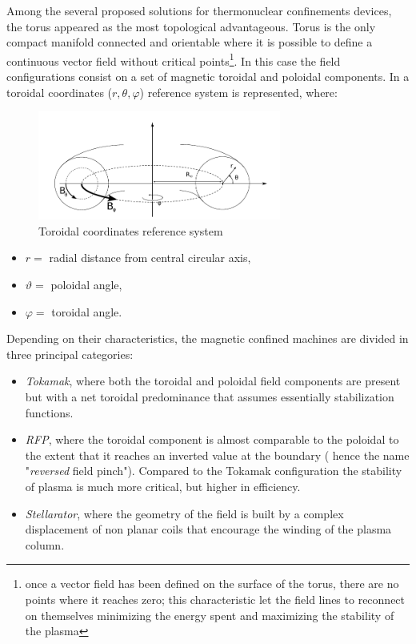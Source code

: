 Among the several proposed solutions for thermonuclear confinements devices, the torus appeared as the most topological advantageous. Torus is the only compact manifold connected and orientable where it is possible to define a continuous vector field without critical points\footnote{once a vector field has been defined on the surface of the torus, there are no points where it reaches zero; this characteristic let the field lines to reconnect on themselves minimizing the energy spent and maximizing the stability of the plasma}.
In this case the field configurations consist on a set of magnetic toroidal and poloidal components. In \Figure{\ref{fig:intro_toroidal_coords}} a toroidal coordinates ($r,\theta,\varphi$) reference system is represented, where:
\begin{figure}[h!]
    \centering
    \includegraphics[width=8cm]{img/1_intro/toroidal_coords.png}
    \caption{Toroidal coordinates reference system}
    \label{fig:intro_toroidal_coords}
\end{figure}
\begin{itemize}
    \item $r = $ radial distance from central circular axis,
    \item $\vartheta = $ poloidal angle,
    \item $\varphi = $ toroidal angle.
\end{itemize}
Depending on their characteristics, the magnetic confined machines are divided in three principal categories:
\begin{itemize}
    \item \textit{Tokamak}, where both the toroidal and poloidal field components are present but with a net toroidal predominance that assumes essentially stabilization functions.
    \item \textit{RFP}, where the toroidal component is almost comparable to the poloidal to the extent that it reaches an inverted value at the boundary ( hence the name "\textit{reversed} field pinch"). Compared to the Tokamak configuration the stability of plasma is much more critical, but higher in efficiency.
    \item \textit{Stellarator}, where the geometry of the field is built by a complex displacement of non planar coils that encourage the winding of the plasma column.
\end{itemize}

